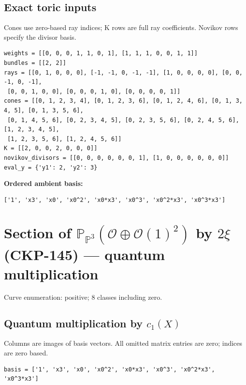 \documentclass[10pt,a4paper]{article}
\begin{document}
\subsection*{Exact toric inputs}
Cones use zero-based ray indices; K rows are full ray coefficients. Novikov rows specify the divisor basis.

\begin{lstlisting}
weights = [[0, 0, 0, 1, 1, 0, 1], [1, 1, 1, 0, 0, 1, 1]]
bundles = [[2, 2]]
rays = [[0, 1, 0, 0, 0], [-1, -1, 0, -1, -1], [1, 0, 0, 0, 0], [0, 0, -1, 0, -1],
 [0, 0, 1, 0, 0], [0, 0, 0, 1, 0], [0, 0, 0, 0, 1]]
cones = [[0, 1, 2, 3, 4], [0, 1, 2, 3, 6], [0, 1, 2, 4, 6], [0, 1, 3, 4, 5], [0, 1, 3, 5, 6],
 [0, 1, 4, 5, 6], [0, 2, 3, 4, 5], [0, 2, 3, 5, 6], [0, 2, 4, 5, 6], [1, 2, 3, 4, 5],
 [1, 2, 3, 5, 6], [1, 2, 4, 5, 6]]
K = [[2, 0, 0, 2, 0, 0, 0]]
novikov_divisors = [[0, 0, 0, 0, 0, 0, 1], [1, 0, 0, 0, 0, 0, 0]]
eval_y = {'y1': 2, 'y2': 3}
\end{lstlisting}

\textbf{Ordered ambient basis:}
\begin{lstlisting}
['1', 'x3', 'x0', 'x0^2', 'x0*x3', 'x0^3', 'x0^2*x3', 'x0^3*x3']
\end{lstlisting}

\clearpage\section*{Section of $\mathbb P_{\mathbb P^{3}}(\mathcal O\oplus \mathcal O(1)^{2})$ by $2\xi $ (CKP-145) --- quantum multiplication}

Curve enumeration: positive; 8 classes including zero.
\subsection*{Quantum multiplication by $c_1(X)$}
Columns are images of basis vectors. All omitted matrix entries are zero; indices are zero based.

\begin{lstlisting}
basis = ['1', 'x3', 'x0', 'x0^2', 'x0*x3', 'x0^3', 'x0^2*x3', 'x0^3*x3']
\end{lstlisting}
\end{document}
